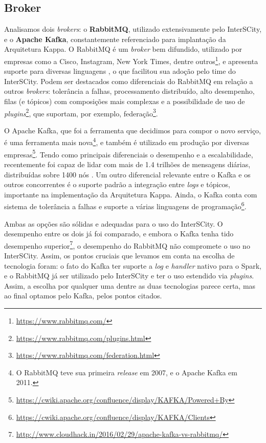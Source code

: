 \subsection{Broker}

Analisamos dois \textit{brokers}: o \textbf{RabbitMQ}, utilizado
extensivamente pelo InterSCity, e o \textbf{Apache Kafka}, constantemente
referenciado para implantação da Arquitetura Kappa. O RabbitMQ é um
\textit{broker} bem difundido, utilizado por empresas como a Cisco, Instagram,
New York Times, dentre outros\footnote{\url{https://www.rabbitmq.com/}},
e apresenta suporte para diversas linguagens \cite{zaitsev2014}, o que
facilitou sua adoção pelo time do InterSCity. Podem ser destacados como
diferenciais do RabbitMQ em relação a outros \textit{brokers}: tolerância a
falhas, processamento distribuído, alto desempenho, filas (e tópicos) com
composições mais complexas e a possibilidade de uso de
\textit{plugins}\footnote{\url{https://www.rabbitmq.com/plugins.html}},
que suportam, por exemplo,
federação\footnote{\url{https://www.rabbitmq.com/federation.html}}.

O Apache Kafka, que foi a ferramenta que decidimos para compor o novo serviço,
é uma ferramenta mais nova\footnote{O RabbitMQ teve
sua primeira \textit{release} em 2007, e o Apache Kafka em 2011.}, e também é
utilizado em produção por diversas
empresas\footnote{\url{https://cwiki.apache.org/confluence/display/KAFKA/Powered+By}}.
Tendo como principais diferenciais o desempenho e a escalabilidade,
recentemente foi capaz de lidar com mais de 1.4 trilhões de mensagens diárias,
distribuídas sobre 1400 nós \cite{koshy2016}. Um outro diferencial relevante
entre o Kafka e os outros concorrentes é o suporte padrão a integração entre
\textit{logs} e tópicos, importante na implementação da Arquitetura Kappa. Ainda,
o Kafka conta com sistema de tolerância a falhas e suporte a várias linguagens de
programação\footnote{\url{https://cwiki.apache.org/confluence/display/KAFKA/Clients}}.

Ambas as opções são sólidas e adequadas para o uso do InterSCity. O
desempenho entre os dois já foi comparado, e embora o Kafka tenha tido desempenho
superior\footnote{\url{http://www.cloudhack.in/2016/02/29/apache-kafka-vs-rabbitmq/}},
o desempenho do RabbitMQ não compromete o uso no InterSCity. Assim, os pontos
cruciais que levamos em conta na escolha de tecnologia foram: o fato do Kafka
ter suporte a \textit{log} e \textit{handler} nativo para o Spark, e o RabbitMQ
já ser utilizado pelo InterSCity e ter o uso estendido via \textit{plugins}.
Assim, a escolha por qualquer uma dentre as duas tecnologias parece certa, mas
ao final optamos pelo Kafka, pelos pontos citados.
